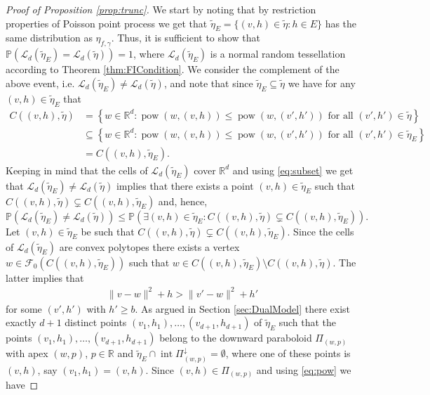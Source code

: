 \documentclass[11pt,a4paper]{article}
\theoremstyle{plain}
\theoremstyle{definition}
\theoremstyle{remark}
\def\PP{\mathbb{P}}
\def\RR{\mathbb{R}}
\def\cF{\mathcal{F}}
\def\cL{\mathcal{L}}
\newcommand{\pow}{\mathop{\mathrm{pow}}\nolimits}
\newcommand{\inter}{\operatorname{int}}
\begin{document}
\begin{proof}[Proof of Proposition \ref{prop:trunc}]
We start by noting that by restriction properties of Poisson point process \cite[Theorem 5.2]{LP} we get that $\widetilde\eta_{E}=\{(v,h)\in\widetilde \eta\colon h\in E\}$ has the same distribution as $\eta_{f,\gamma}$. Thus, it is sufficient to show that $\PP(\cL_{d}(\widetilde\eta_{E})=\cL_{d}(\widetilde\eta))=1$, where $\cL_{d}(\widetilde\eta_{E})$ is a normal random tessellation according to Theorem \ref{thm:FICondition}. 
We consider the complement of the above event, i.e. $\cL_{d}(\widetilde\eta_{E})\neq\cL_{d}(\widetilde\eta)$, and note that since $\widetilde{\eta}_{E}\subseteq \widetilde{\eta}$ we have for any $(v,h)\in\widetilde{\eta}_{E}$ that
\begin{equation}\label{eq:subset}
    \begin{aligned}
        C((v,h),\widetilde{\eta})&=\left\{w \in \RR^d: \pow(w,(v,h)) \le \pow(w,(v',h')) \text{ for all } (v',h') \in \widetilde{\eta}\right\}\\
        &\subseteq \left\{w \in \RR^d: \pow(w,(v,h)) \le \pow(w,(v',h')) \text{ for all } (v',h') \in \widetilde{\eta}_{E}\right\} \\
        &= C((v,h),\widetilde{\eta}_{E}).
    \end{aligned}
\end{equation}
Keeping in mind that the cells of $\cL_{d}(\widetilde\eta_{E})$ cover $\RR^d$ and using \eqref{eq:subset} we get that $\cL_{d}(\widetilde\eta_{E})\neq\cL_{d}(\widetilde\eta)$ implies that there exists a point $(v,h)\in \widetilde{\eta}_{E}$ such that $C((v,h),\widetilde{\eta}) \subsetneq C((v,h),\widetilde{\eta}_{E})$ and, hence,
\[
    \PP(\cL_{d}(\widetilde\eta_{E})\neq\cL_{d}(\widetilde\eta))\le \PP(\exists (v,h)\in \widetilde{\eta}_{E}: C((v,h),\widetilde{\eta})\subsetneq C((v,h),\widetilde{\eta}_{E})).
\]
Let $(v,h)\in \widetilde{\eta}_{E}$ be such that $C((v,h),\widetilde{\eta})\subsetneq C((v,h),\widetilde{\eta}_{E})$. Since the cells of $\cL_{d}(\widetilde\eta_{E})$ are convex polytopes there exists a vertex $w\in\cF_0(C((v,h),\widetilde{\eta}_{E}))$ such that $w\in C((v,h),\widetilde{\eta}_{E})\setminus C((v,h),\widetilde{\eta})$. The latter implies that
\begin{align}\label{eq:pow}
    \|v-w\|^2+h>\|v'-w\|^2+h'
\end{align} 
for some $(v',h')$ with $h'\ge b$.
As argued in Section \ref{sec:DualModel} there exist exactly $d+1$ distinct points $(v_1,h_1),\ldots, (v_{d+1},h_{d+1})$ of $\widetilde{\eta}_{E}$ such that the points $(v_1,h_1),\ldots, (v_{d+1},h_{d+1})$ belong to the downward paraboloid $\Pi_{(w,p)}$ with apex $(w,p)$, $p\in\RR$ and $\widetilde{\eta}_{E} \cap \inter \Pi_{(w,p)}^{\downarrow}=\emptyset$, where one of these points is $(v,h)$, say $(v_1,h_1)=(v,h)$. Since $(v,h)\in \Pi_{(w,p)}$ and using \eqref{eq:pow} we have 

\end{proof}
\end{document}
